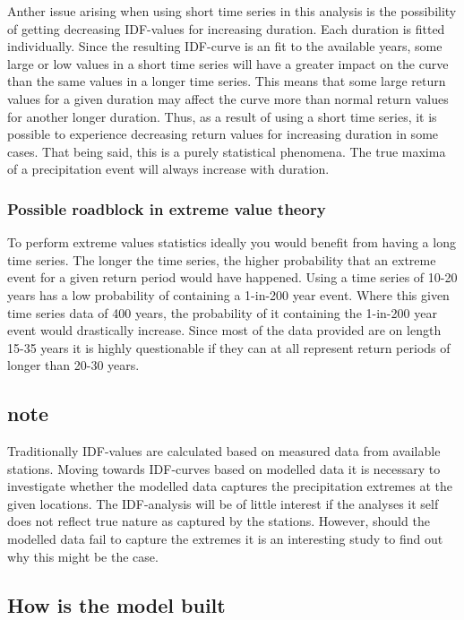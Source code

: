 \documentclass[12pt]{article}
\begin{document}
{Anther issue arising when using short time series in this analysis is the possibility of getting decreasing IDF-values for increasing duration. Each duration is fitted individually. Since the resulting IDF-curve is an fit to the available years, some large or low values in a short time series will have a greater impact on the curve than the same values in a longer time series. This means that some large return values for a given duration may affect the curve more than normal return values for another longer duration. Thus, as a result of using a short time series, it is possible to experience decreasing return values for increasing duration in some cases. That being said, this is a purely statistical phenomena. The true maxima of a precipitation event will always increase with duration.    


\subsubsection{Possible roadblock in extreme value theory}
To perform extreme values statistics ideally you would benefit from having a long time series. The longer the time series, the higher probability that an extreme event for a given return period would have happened. Using a time series of 10-20 years has a low probability of containing a 1-in-200 year event. Where this given time series data of 400 years, the probability of it containing the 1-in-200 year event would drastically increase. Since most of the data provided are on length 15-35 years it is highly questionable if they can at all represent return periods of longer than 20-30 years. 


\subsection{note}
Traditionally IDF-values are calculated based on measured data from available stations. Moving towards IDF-curves based on modelled data it is necessary to investigate whether the modelled data captures the precipitation extremes at the given locations. The IDF-analysis will be of little interest if the analyses it self does not reflect true nature as captured by the stations. However, should the modelled data fail to capture the extremes it is an interesting study to find out why this might be the case.   

\subsection{How is the model built}

}
\end{document}
